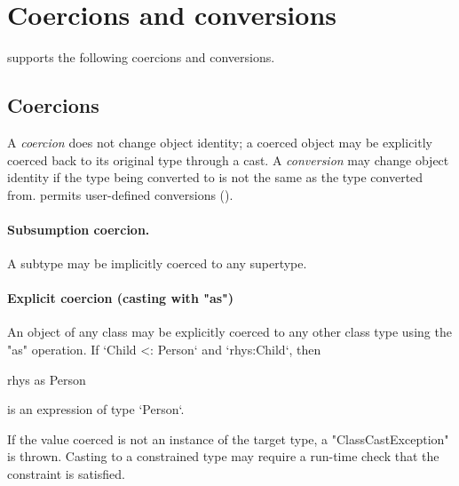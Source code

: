 \section{Coercions and conversions}
\label{XtenConversions}
\label{User-definedCoercions}

\XtenCurrVer{} supports the following coercions and conversions.

\subsection{Coercions}

A {\em coercion} does not change object identity; a coerced object may
be explicitly coerced back to its original type through a cast. A {\em
  conversion} may change object identity if the type being converted
to is not the same as the type converted from. \Xten{} permits
user-defined conversions ().

\paragraph{Subsumption coercion.}
A subtype may be implicitly coerced to any supertype.

\paragraph{Explicit coercion (casting with \xcd"as")}
An object of any class may be explicitly coerced to any other
class type using the \xcd"as" operation.  If \xcd`Child <: Person` and
\xcd`rhys:Child`, then 
\begin{xten}
  rhys as Person
\end{xten}
is an expression of type \xcd`Person`.  

If the value coerced is not an instance of the target type,
a \xcd"ClassCastException" is thrown.  Casting to a constrained
type may require a run-time check that the constraint is
satisfied.



